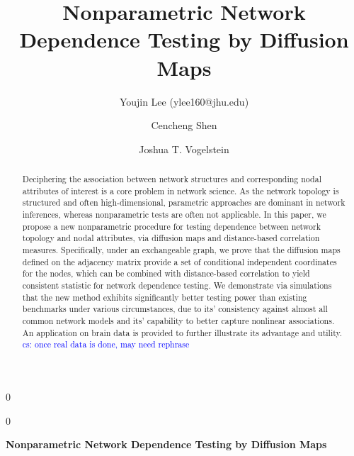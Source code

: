 \documentclass[11pt]{article}
\theoremstyle{definition}
\newcommand{\blind}{0}
\newcommand{\cs}[1]{\textcolor{blue}{cs: #1}}
\begin{document}
	
	\def\spacingset#1{\renewcommand{\baselinestretch}%
		{#1}\small\normalsize} \spacingset{1}
	
	\title{\bf Nonparametric Network Dependence Testing by Diffusion Maps}
	\blind
	{\author[1]{Youjin Lee (ylee160@jhu.edu)} %
		\author[2]{Cencheng Shen} %
		\author[2,3,4]{Joshua T. Vogelstein}
		\date{}
		\maketitle
	} \fi
	
	\blind
	{
		\bigskip
		\bigskip
		\bigskip
		\begin{center}
			{\LARGE\bf Nonparametric Network Dependence Testing by Diffusion Maps}
		\end{center}
		\medskip
	} \fi

	
	\begin{abstract}
		Deciphering the association between network structures and corresponding nodal attributes of interest is a core problem in network science. As the network topology is structured and often high-dimensional, parametric approaches are dominant in network inferences, whereas nonparametric tests are often not applicable. In this paper, we propose a new nonparametric procedure for testing dependence between network topology and nodal attributes, via diffusion maps and distance-based correlation measures. Specifically, under an exchangeable graph, we prove that the diffusion maps defined on the adjacency matrix provide a set of conditional independent coordinates for the nodes, which can be combined with distance-based correlation to yield consistent statistic for network dependence testing. We demonstrate via simulations that the new method exhibits significantly better testing power than existing benchmarks under various circumstances, due to its' consistency against almost all common network models and its' capability to better capture nonlinear associations. An application on brain data is provided to further illustrate its advantage and utility. \cs{once real data is done, may need rephrase}
	\end{abstract}
	
\end{document}
